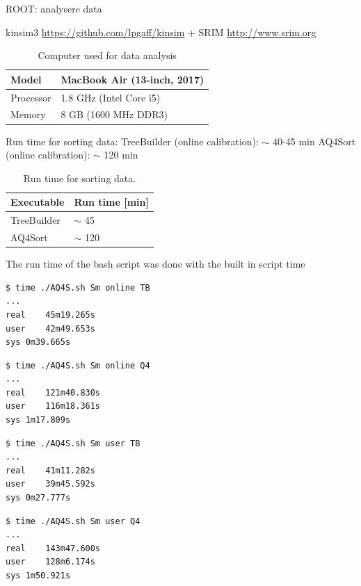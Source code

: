 \documentclass[twoside,english]{uiofysmaster/uiofysmaster}
\begin{document}
\bigskip

ROOT: analysere data

kinsim3 \url{https://github.com/lpgaff/kinsim} + SRIM \url{http://www.srim.org}

\bigskip


\begin{table}[H] \centering 
\caption{Computer used for data analysis}
\label{tab:PC}
\begin{tabular}{ll}
\hline
Model & MacBook Air (13-inch, 2017) \\
\hline
Processor & 1.8 GHz (Intel Core i5) \\
Memory & 8 GB (1600 MHz DDR3) \\
\hline
\end{tabular}
\end{table}

Run time for sorting data: \newline
TreeBuilder (online calibration): $\sim$ 40-45 min \newline
AQ4Sort (online calibration): $\sim$ 120 min

\begin{table}[H] \centering 
\caption{Run time for sorting data.}
\label{tab:run_time}
\begin{tabular}{ll}
\hline
Executable & Run time [min] \\
\hline
TreeBuilder & $\sim$ 45 \\
AQ4Sort & $\sim$ 120 \\
\hline
\end{tabular}
\end{table}

The run time of the bash script was done with the built in script time

\begin{lstlisting}[language=sh]
$ time ./AQ4S.sh Sm online TB
...
real	45m19.265s
user	42m49.653s
sys	0m39.665s
\end{lstlisting}


\begin{lstlisting}[language=sh]
$ time ./AQ4S.sh Sm online Q4
...
real	121m40.830s
user	116m18.361s
sys	1m17.809s
\end{lstlisting}


\begin{lstlisting}[language=sh]
$ time ./AQ4S.sh Sm user TB
...
real	41m11.282s
user	39m45.592s
sys	0m27.777s
\end{lstlisting}


\begin{lstlisting}[language=sh]
$ time ./AQ4S.sh Sm user Q4
...
real	143m47.600s
user	128m6.174s
sys	1m50.921s
\end{lstlisting}
\end{document}
